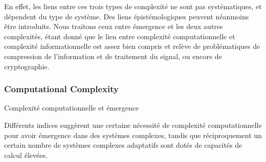 En effet, les liens entre ces trois types de complexité ne sont pas systématiques, et dépendent du type de système. Des liens épistémologiques peuvent néanmoins être introduits. Nous traitons ceux entre émergence et les deux autres complexités, étant donné que le lien entre complexité computationnelle et complexité informationnelle est assez bien compris et relève de problématiques de compression de l'information et de traitement du signal, ou encore de cryptographie.


\subsubsection{Computational Complexity}{Complexité computationnelle et émergence}



Différents indices suggèrent une certaine nécessité de complexité computationnelle pour avoir émergence dans des systèmes complexes, tandis que réciproquement un certain nombre de systèmes complexes adaptatifs sont dotés de capacités de calcul élevées.


